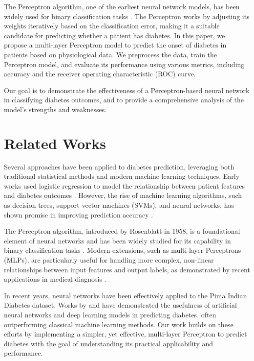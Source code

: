 \documentclass[10pt,twocolumn,letterpaper]{article}
\begin{document}
The Perceptron algorithm, one of the earliest neural network models, has been widely used for binary classification tasks \cite{rosenblatt1958perceptron}. The Perceptron works by adjusting its weights iteratively based on the classification error, making it a suitable candidate for predicting whether a patient has diabetes. In this paper, we propose a multi-layer Perceptron model to predict the onset of diabetes in patients based on physiological data. We preprocess the data, train the Perceptron model, and evaluate its performance using various metrics, including accuracy and the receiver operating characteristic (ROC) curve.

Our goal is to demonstrate the effectiveness of a Perceptron-based neural network in classifying diabetes outcomes, and to provide a comprehensive analysis of the model’s strengths and weaknesses.


\section{Related Works}
Several approaches have been applied to diabetes prediction, leveraging both traditional statistical methods and modern machine learning techniques. Early works used logistic regression to model the relationship between patient features and diabetes outcomes \cite{hosmer2013applied}. However, the rise of machine learning algorithms, such as decision trees, support vector machines (SVMs), and neural networks, has shown promise in improving prediction accuracy \cite{begum2024machine}.

The Perceptron algorithm, introduced by Rosenblatt in 1958, is a foundational element of neural networks and has been widely studied for its capability in binary classification tasks \cite{rosenblatt1958perceptron}. Modern extensions, such as multi-layer Perceptrons (MLPs), are particularly useful for handling more complex, non-linear relationships between input features and output labels, as demonstrated by recent applications in medical diagnosis \cite{hastie2009elements}.

In recent years, neural networks have been effectively applied to the Pima Indian Diabetes dataset. Works by \cite{el_jerjawi2018diabetes} and \cite{ghorbani2019predictive} have demonstrated the usefulness of artificial neural networks and deep learning models in predicting diabetes, often outperforming classical machine learning methods. Our work builds on these efforts by implementing a simpler, yet effective, multi-layer Perceptron to predict diabetes with the goal of understanding its practical applicability and performance.
\end{document}

